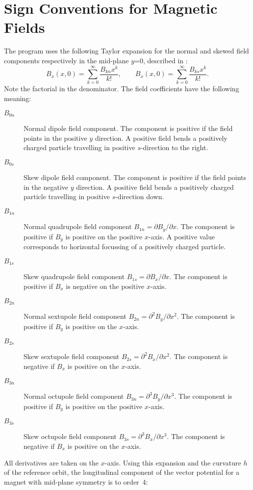 \section{Sign Conventions for Magnetic Fields}
\label{sec:sign}
The \opalmap program uses the following Taylor expansion for the normal and
skewed field components respectively in the mid-plane $y$=0, 
described in :
\[
B_x(x,0)=\sum_{k=0}^{\infty}\frac{B_{kn}x^k}{k!}, \qquad
B_x(x,0)=\sum_{k=0}^{\infty}\frac{B_{ks}x^k}{k!}.
\]
Note the factorial in the denominator.
The field coefficients have the following meaning:
\begin{description}
\item[$B_{0n}$] Normal dipole field component.
  The component is positive if the field points in the positive $y$
  direction. 
  A positive field bends a positively charged particle travelling in
  positive $s$-direction to the right.
\item[$B_{0s}$] Skew dipole field component.
  The component is positive if the field points in the negative $y$
  direction. 
  A positive field bends a positively charged particle travelling in
  positive $s$-direction down.
\item[$B_{1n}$] Normal quadrupole field component
  $B_{1n}=\partial B_y/\partial x$.
  The component is positive if $B_y$ is positive on the positive $x$-axis.
  A positive value corresponds to horizontal focussing of a positively
  charged particle.
\item[$B_{1s}$] Skew quadrupole field component
  $B_{1s}=\partial B_x/\partial x$.
  The component is positive if $B_x$ is negative on the positive $x$-axis.
\item[$B_{2n}$] Normal sextupole field component
  $B_{2n}=\partial^2 B_y/\partial x^2$.
  The component is positive if $B_y$ is positive on the $x$-axis.
\item[$B_{2s}$] Skew sextupole field component
  $B_{2s}=\partial^2 B_x/\partial x^2$.
  The component is negative if $B_x$ is positive on the $x$-axis.
\item[$B_{3n}$] Normal octupole field component
  $B_{3n}=\partial^3 B_y/\partial x^3$.
  The component is positive if $B_y$ is positive on the positive $x$-axis.
\item[$B_{3s}$] Skew octupole field component
  $B_{3s}=\partial^3 B_x/\partial x^3$.
  The component is negative if $B_x$ is positive on the $x$-axis.
\end{description}
All derivatives are taken on the $x$-axis.
Using this expansion and the curvature $h$ of the reference orbit,
the longitudinal component of the vector potential for a magnet with
mid-plane symmetry is to order~4:

